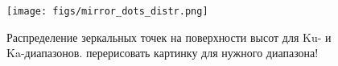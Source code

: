 \begin{figure}[h]
    \centering
    \texttt{[image: figs/mirror\_dots\_distr.png]}
    \caption{Распределение зеркальных точек на поверхности высот для Ku- и
    Ka-диапазонов. {\color{red}  перерисовать картинку для нужного диапазона!}}
    \label{fig:}
\end{figure}









